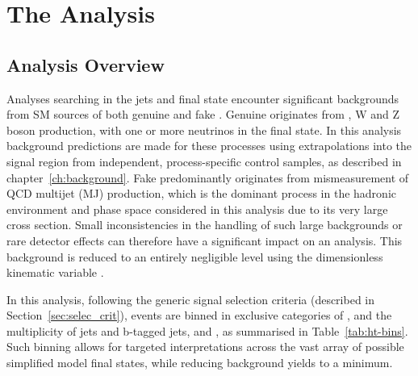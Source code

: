 \chapter{The \alphat Analysis}
\label{ch:analysis}

\ifpdf
    \graphicspath{{Chapter5/Figs/Raster/}{Chapter5/Figs/PDF/}{Chapter5/Figs/}}
\else
    \graphicspath{{Chapter5/Figs/Vector/}{Chapter5/Figs/}}
\fi


\section{Analysis Overview}  %
\label{sec:selection_analysis_overview}

Analyses searching in the jets and \met final state encounter significant 
backgrounds from SM sources of both genuine and fake \met. Genuine \met 
originates from \ttbar, W and Z boson production, with one or more
neutrinos in the final state. In this analysis background predictions are made
for these processes using 
extrapolations into the signal region from independent, process-specific control
samples, as described in chapter~\ref{ch:background}.
Fake \met predominantly originates from mismeasurement of QCD 
multijet (MJ) production, which is the dominant process in the hadronic
environment
and  phase space considered in this analysis due to its very large cross
section.  Small inconsistencies in the handling of such large backgrounds or
rare detector effects can therefore 
have a significant impact on an analysis. This background is reduced to an 
entirely negligible level using the dimensionless kinematic variable \alphat.


In this analysis, following the generic signal selection criteria (described in
Section~\ref{sec:selec_crit}), events are binned in exclusive categories of \HT, 
and the multiplicity of jets and b-tagged jets,  
\nj and \nb, as summarised in Table~\ref{tab:ht-bins}. Such binning allows for
targeted interpretations across the vast array of
possible simplified model final states, while reducing background yields to a 
minimum.

